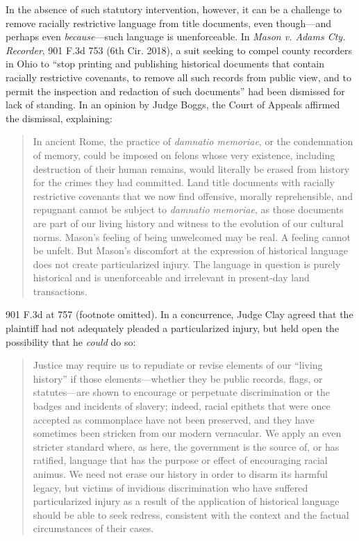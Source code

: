 In the absence of such statutory intervention, however, it can be a challenge to
remove racially restrictive language from title documents, even though---and
perhaps even \textit{because}---such language is unenforceable. In \textit{Mason
v. Adams Cty. Recorder}, 901 F.3d 753 (6th Cir. 2018), a suit seeking to compel
county recorders in Ohio to ``stop printing and publishing historical documents
that contain racially restrictive covenants, to remove all such records from
public view, and to permit the inspection and redaction of such documents'' had
been dismissed for lack of standing. In an opinion by Judge Boggs, the Court of
Appeals affirmed the dismissal, explaining:
\begin{quote}
In ancient Rome, the practice of \textit{damnatio memoriae}, or the condemnation
of memory, could be imposed on felons whose very existence, including
destruction of their human remains, would literally be erased from history for
the crimes they had committed. Land title documents with racially restrictive
covenants that we now find offensive, morally reprehensible, and repugnant
cannot be subject to \textit{damnatio memoriae}, as those documents are part of
our living history and witness to the evolution of our cultural norms. Mason's
feeling of being unwelcomed may be real. A feeling cannot be unfelt. But Mason's
discomfort at the expression of historical language does not create
particularized injury. The language in question is purely historical and is
unenforceable and irrelevant in present-day land transactions.
\end{quote}
901 F.3d at 757 (footnote omitted). In a concurrence, Judge Clay agreed that the
plaintiff had not adequately pleaded a particularized injury, but held open the
possibility that he \textit{could} do so: 
\begin{quote}
Justice may require us to repudiate or revise elements of our ``living history''
if those elements---whether they be public records, flags, or statutes---are
shown to encourage or perpetuate discrimination or the badges and incidents of
slavery; indeed, racial epithets that were once accepted as commonplace have not
been preserved, and they have sometimes been stricken from our modern
vernacular. We apply an even stricter standard where, as here, the government is
the source of, or has ratified, language that has the purpose or effect of
encouraging racial animus. We need not erase our history in order to disarm its
harmful legacy, but victims of invidious discrimination who have suffered
particularized injury as a result of the application of historical language
should be able to seek redress, consistent with the context and the factual
circumstances of their cases.
\end{quote}
